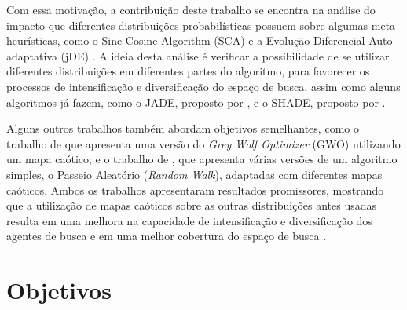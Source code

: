 Com essa motivação, a contribuição deste trabalho se encontra na análise do impacto que diferentes distribuições probabilísticas possuem sobre algumas meta-heurísticas, como o Sine Cosine Algorithm (SCA) \cite{mirjalili} e a Evolução Diferencial Auto-adaptativa (jDE) \cite{brest}. A ideia desta análise é verificar a possibilidade de se utilizar diferentes distribuições em diferentes partes do algoritmo, para favorecer os processos de intensificação e diversificação do espaço de busca, assim como alguns algoritmos já fazem, como o JADE, proposto por \cite{zhang}, e o SHADE, proposto por \cite{tanabe}.

Alguns outros trabalhos também abordam objetivos semelhantes, como o trabalho de \cite{saxena} que apresenta uma versão do \textit{Grey Wolf Optimizer} (GWO) utilizando um mapa caótico; e o trabalho de \cite{jana}, que apresenta várias versões de um algoritmo simples, o Passeio Aleatório (\textit{Random Walk}), adaptadas com diferentes mapas caóticos. Ambos os trabalhos apresentaram resultados promissores, mostrando que a utilização de mapas caóticos sobre as outras distribuições antes usadas resulta em uma melhora na capacidade de intensificação e diversificação dos agentes de busca \cite{saxena} e em uma melhor cobertura do espaço de busca \cite{jana}.





\section{Objetivos}

